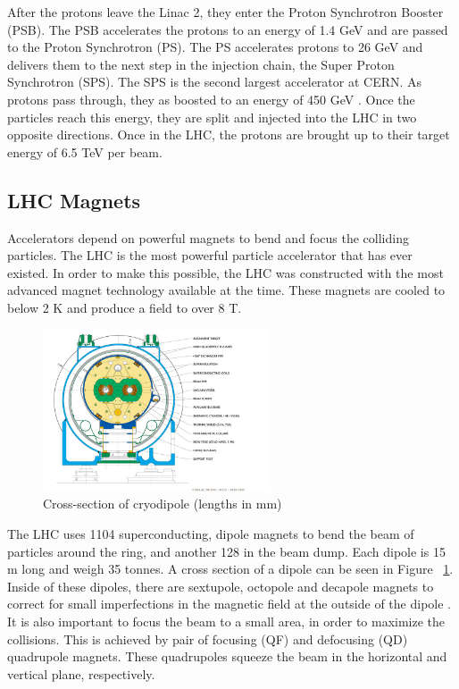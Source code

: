 \indent After the protons leave the Linac 2, they enter the Proton Synchrotron Booster (PSB)\cite{Reich}. The PSB accelerates the protons to an energy of 1.4 GeV and are passed to the Proton Synchrotron (PS). The PS accelerates protons to 26 GeV and delivers them to the next step in the injection chain, the Super Proton Synchrotron (SPS). The SPS is the second largest accelerator at CERN. As protons pass through, they as boosted to an energy of 450 GeV \cite{Brianti:340514}. Once the particles reach this energy, they are split and injected into the LHC in two opposite directions. Once in the LHC, the protons are brought up to their target energy of 6.5 TeV per beam.
\subsection{LHC Magnets} 
Accelerators depend on powerful magnets to bend and focus the colliding particles. The LHC is the most powerful particle accelerator that has ever existed. In order to make this possible, the LHC was constructed with the most advanced magnet technology available at the time. These magnets are cooled to below 2 K and produce a field to over 8 T.\linebreak
\begin{figure}[h]
\begin{center}
\includegraphics*[width=0.60\textwidth] {figures/Cross-section-of-a-LHC-superconducting-cryodipole-85}%
\caption[Cross-section of cryodipole (lengths in mm)]{Cross-section of cryodipole (lengths in mm)}
\label{fig:cryo_cross}
\end{center}
\end{figure}

\indent The LHC uses 1104 superconducting, dipole magnets to bend the beam of particles around the ring, and another 128 in the beam dump.  Each dipole is 15 m long and weigh 35 tonnes. A cross section of a dipole can be seen in Figure ~\ref{fig:cryo_cross}. Inside of these dipoles, there are sextupole, octopole and decapole magnets to correct for small imperfections in the magnetic field at the outside of the dipole \cite{Evans_2008}. \linebreak
\indent	It is also important to focus the beam to a small area, in order to maximize the collisions. This is achieved by 
pair of focusing (QF) and defocusing (QD) quadrupole magnets. These quadrupoles squeeze the beam in the horizontal and vertical plane, respectively. 
